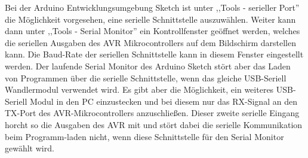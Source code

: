 Bei der Arduino Entwicklungsumgebung Sketch ist unter ,,Tools - serieller Port'' die Möglichkeit vorgesehen,
eine serielle Schnittstelle auszuwählen. Weiter kann dann unter ,,Tools - Serial Monitor'' ein Kontrollfenster
geöffnet werden, welches die seriellen Ausgaben des AVR Mikrocontrollers auf dem Bildschirm darstellen
kann. Die Baud-Rate der seriellen Schnittstelle kann in diesem Fenster eingestellt werden.
Der laufende Serial Monitor des Arduino Sketch stört aber das Laden von Programmen über die serielle
Schnittstelle, wenn das gleiche USB-Seriell Wandlermodul verwendet wird.
Es gibt aber die Möglichkeit, ein weiteres USB-Seriell Modul in den PC einzustecken und bei diesem
nur das RX-Signal an den TX-Port des AVR-Mikrocontrollers anzuschließen.
Dieser zweite serielle Eingang horcht so die Ausgaben des AVR mit und stört dabei die serielle 
Kommunikation beim Programm-laden nicht, wenn diese Schnittstelle für den Serial Monitor gewählt wird.

